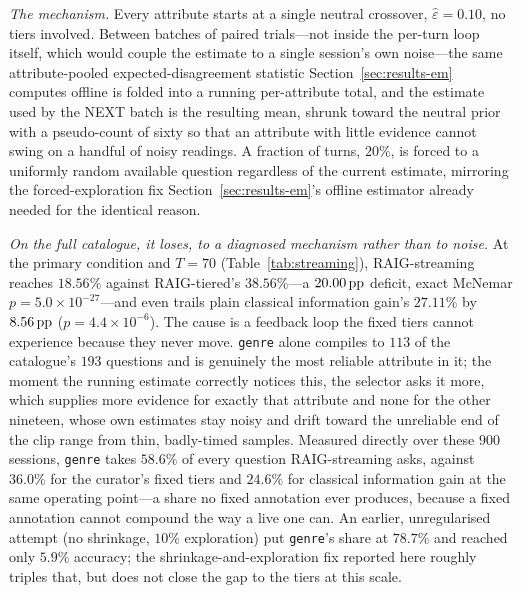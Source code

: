 \emph{The mechanism.} Every attribute starts at a single neutral crossover,
$\hat\varepsilon = 0.10$, no tiers involved. Between batches of paired
trials---not inside the per-turn loop itself, which would couple the estimate
to a single session's own noise---the same attribute-pooled
expected-disagreement statistic Section~\ref{sec:results-em} computes offline
is folded into a running per-attribute total, and the estimate used by the
NEXT batch is the resulting mean, shrunk toward the neutral prior with a
pseudo-count of sixty so that an attribute with little evidence cannot swing
on a handful of noisy readings. A fraction of turns, $20\%$, is forced to a
uniformly random available question regardless of the current estimate,
mirroring the forced-exploration fix Section~\ref{sec:results-em}'s offline
estimator already needed for the identical reason.

\emph{On the full catalogue, it loses, to a diagnosed mechanism rather than to
noise.} At the primary condition and $T=70$ (Table~\ref{tab:streaming}),
RAIG-streaming reaches $18.56\%$ against RAIG-tiered's $38.56\%$---a
$20.00\,\text{pp}$ deficit, exact McNemar $p = 5.0\times10^{-27}$---and even trails
plain classical information gain's $27.11\%$ by $8.56\,\text{pp}$
($p = 4.4\times10^{-6}$). The cause is a feedback loop the fixed tiers cannot
experience because they never move. \texttt{genre} alone compiles to $113$ of
the catalogue's $193$ questions and is genuinely the most reliable attribute
in it; the moment the running estimate correctly notices this, the selector
asks it more, which supplies more evidence for exactly that attribute and
none for the other nineteen, whose own estimates stay noisy and drift toward
the unreliable end of the clip range from thin, badly-timed samples. Measured
directly over these $900$ sessions, \texttt{genre} takes $58.6\%$ of every
question RAIG-streaming asks, against $36.0\%$ for the curator's fixed tiers
and $24.6\%$ for classical information gain at the same operating
point---a share no fixed annotation ever produces, because a fixed annotation
cannot compound the way a live one can. An earlier, unregularised attempt
(no shrinkage, $10\%$ exploration) put \texttt{genre}'s share at $78.7\%$ and
reached only $5.9\%$ accuracy; the shrinkage-and-exploration fix reported here
roughly triples that, but does not close the gap to the tiers at this scale.


